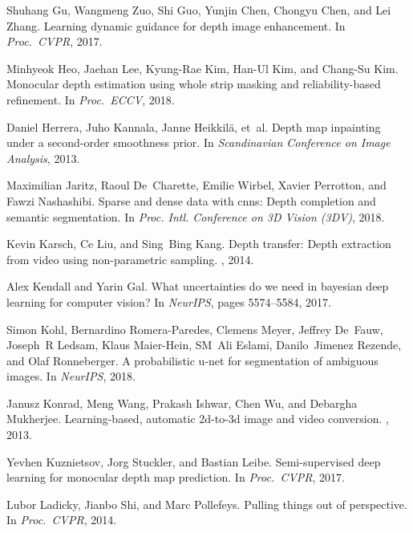 \documentclass[10pt,twocolumn,letterpaper]{article}
\begin{document}
{\begin{thebibliography}{10}
Shuhang Gu, Wangmeng Zuo, Shi Guo, Yunjin Chen, Chongyu Chen, and Lei Zhang.
\newblock Learning dynamic guidance for depth image enhancement.
\newblock In {\em Proc.~CVPR}, 2017.

Minhyeok Heo, Jaehan Lee, Kyung-Rae Kim, Han-Ul Kim, and Chang-Su Kim.
\newblock Monocular depth estimation using whole strip masking and
  reliability-based refinement.
\newblock In {\em Proc.~ECCV}, 2018.

Daniel Herrera, Juho Kannala, Janne Heikkil{\"a}, et~al.
\newblock Depth map inpainting under a second-order smoothness prior.
\newblock In {\em Scandinavian Conference on Image Analysis}, 2013.

Maximilian Jaritz, Raoul De~Charette, Emilie Wirbel, Xavier Perrotton, and
  Fawzi Nashashibi.
\newblock Sparse and dense data with cnns: Depth completion and semantic
  segmentation.
\newblock In {\em Proc. Intl. Conference on 3D Vision (3DV)}, 2018.

Kevin Karsch, Ce Liu, and Sing~Bing Kang.
\newblock Depth transfer: Depth extraction from video using non-parametric
  sampling.
, 2014.

Alex Kendall and Yarin Gal.
\newblock What uncertainties do we need in bayesian deep learning for computer
  vision?
\newblock In {\em NeurIPS}, pages 5574--5584, 2017.

Simon Kohl, Bernardino Romera-Paredes, Clemens Meyer, Jeffrey De~Fauw, Joseph~R
  Ledsam, Klaus Maier-Hein, SM~Ali Eslami, Danilo~Jimenez Rezende, and Olaf
  Ronneberger.
\newblock A probabilistic u-net for segmentation of ambiguous images.
\newblock In {\em NeurIPS}, 2018.

Janusz Konrad, Meng Wang, Prakash Ishwar, Chen Wu, and Debargha Mukherjee.
\newblock Learning-based, automatic 2d-to-3d image and video conversion.
, 2013.

Yevhen Kuznietsov, Jorg Stuckler, and Bastian Leibe.
\newblock Semi-supervised deep learning for monocular depth map prediction.
\newblock In {\em Proc.~CVPR}, 2017.

Lubor Ladicky, Jianbo Shi, and Marc Pollefeys.
\newblock Pulling things out of perspective.
\newblock In {\em Proc.~CVPR}, 2014.


\end{thebibliography}}
\end{document}
